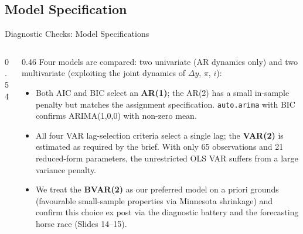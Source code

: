 \documentclass[9pt]{beamer}
\begin{document}
\subsection{Model Specification}
\begin{frame}{Diagnostic Checks: Model Specifications}
\small

\begin{columns}
  \begin{column}{0.54\textwidth}
\vspace{-0.2cm}
    {\fontsize{5.5}{6}\selectfont
    \setlength{\tabcolsep}{2.5pt}
    \setlength{\abovecaptionskip}{1pt}
    \setlength{\belowcaptionskip}{1pt}
    
    \vspace{0.1cm}
    
    \vspace{0.1cm}
    
    }
  \end{column}

  \begin{column}{0.46\textwidth}
    \footnotesize
    Four models are compared: two univariate (AR dynamics only) and two multivariate (exploiting the joint dynamics of $\Delta y$, $\pi$, $i$):
    \begin{itemize}
      \item Both AIC and BIC select an \textbf{AR(1)}; the AR(2) has a small in-sample penalty but matches the assignment specification. \texttt{auto.arima} with BIC confirms ARIMA(1,0,0) with non-zero mean.

      \item All four VAR lag-selection criteria select a single lag; the \textbf{VAR(2)} is estimated as required by the brief. With only 65 observations and 21 reduced-form parameters, the unrestricted OLS VAR suffers from a large variance penalty.

      \item We treat the \textbf{BVAR(2)} as our preferred model on a priori grounds (favourable small-sample properties via Minnesota shrinkage) and confirm this choice ex post via the diagnostic battery and the forecasting horse race (Slides 14--15).
    \end{itemize}
  \end{column}
\end{columns}

\end{frame}
\end{document}
